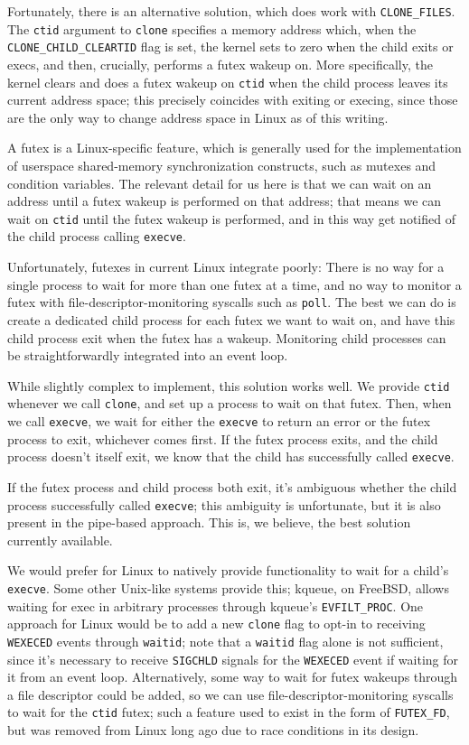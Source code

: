 \documentclass{acmart}
\begin{document}
Fortunately, there is an alternative solution, which does work with \verb|CLONE_FILES|.
The \texttt{ctid} argument to \texttt{clone} specifies a memory address which,
when the \verb|CLONE_CHILD_CLEARTID| flag is set,
the kernel sets to zero when the child exits or execs,
and then, crucially, performs a futex wakeup on.
More specifically,
the kernel clears and does a futex wakeup on \texttt{ctid} when the child process leaves its current address space;
this precisely coincides with exiting or execing,
since those are the only way to change address space in Linux as of this writing.

A futex is a Linux-specific feature,
which is generally used for the implementation of userspace shared-memory synchronization constructs,
such as mutexes and condition variables.
The relevant detail for us here is that we can wait on an address
until a futex wakeup is performed on that address;
that means we can wait on \texttt{ctid} until the futex wakeup is performed,
and in this way get notified of the child process calling \texttt{execve}.

Unfortunately, futexes in current Linux integrate poorly:
There is no way for a single process to wait for more than one futex at a time,
and no way to monitor a futex with file-descriptor-monitoring syscalls such as \texttt{poll}.
The best we can do is create a dedicated child process for each futex we want to wait on,
and have this child process exit when the futex has a wakeup.
Monitoring child processes can be straightforwardly integrated into an event loop.

While slightly complex to implement, this solution works well.
We provide \texttt{ctid} whenever we call \texttt{clone},
and set up a process to wait on that futex.
Then, when we call \texttt{execve},
we wait for either the \texttt{execve} to return an error or the futex process to exit,
whichever comes first.
If the futex process exits,
and the child process doesn't itself exit,
we know that the child has successfully called \texttt{execve}.

If the futex process and child process both exit,
it's ambiguous whether the child process successfully called \texttt{execve};
this ambiguity is unfortunate, but it is also present in the pipe-based approach.
This is, we believe, the best solution currently available.

We would prefer for Linux to natively provide functionality to wait for a child's \texttt{execve}.
Some other Unix-like systems provide this;
kqueue, on FreeBSD, allows waiting for exec in arbitrary processes through kqueue's \verb|EVFILT_PROC|.
One approach for Linux would be to add a new \texttt{clone} flag to opt-in to receiving \texttt{WEXECED} events through \texttt{waitid};
note that a \texttt{waitid} flag alone is not sufficient,
since it's necessary to receive \texttt{SIGCHLD} signals for the \texttt{WEXECED} event if waiting for it from an event loop.
Alternatively, some way to wait for futex wakeups through a file descriptor could be added,
so we can use file-descriptor-monitoring syscalls to wait for the \texttt{ctid} futex;
such a feature used to exist in the form of \verb|FUTEX_FD|,
but was removed from Linux long ago due to race conditions in its design.
\end{document}
